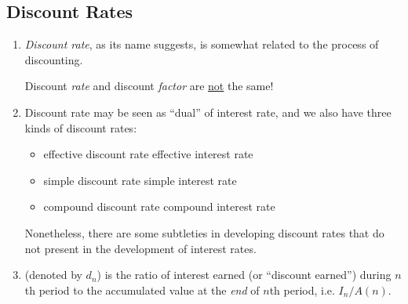 \subsection{Discount Rates}
\label{subsect:discount-rates}
\begin{enumerate}
\item \emph{Discount rate}, as its name suggests, is somewhat related to the
process of discounting.

\begin{warning}
Discount \emph{rate} and discount \emph{factor} are \underline{not}
the same!
\end{warning}
\item Discount rate may be seen as ``dual'' of interest rate, and we also have
three kinds of discount rates:
\begin{itemize}
\item effective discount rate  effective interest rate
\item simple discount rate  simple interest rate
\item compound discount rate  compound interest rate
\end{itemize}
\begin{note}
Nonetheless, there are some subtleties in developing discount rates that do not
present in the development of interest rates.
\end{note}

\item {} (denoted by
\(d_n\)) is the ratio of interest earned (or ``discount earned'') during
\(n\)th period to the accumulated value at the \emph{end} of \(n\)th
period, i.e.  \(I_n/A(n)\).


\end{enumerate}
